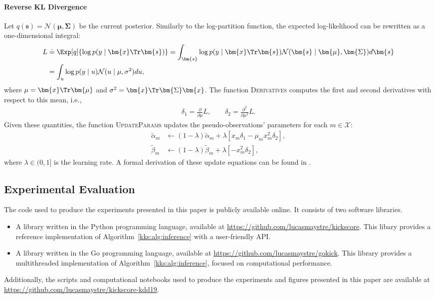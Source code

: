 \paragraph{Reverse KL Divergence}

Let $q(\bm{s}) = \mathcal{N}(\bm{\mu}, \bm{\Sigma})$ be the current posterior.
Similarly to the log-partition function, the expected log-likelihood can be rewritten as a one-dimensional integral:
\begin{align*}
	L
	 & \doteq \Exp[q]{ \log p(y \mid \bm{x}\Tr \bm{s}) }
	= \int_{\bm{s}} \log p(y \mid \bm{x}\Tr \bm{s}) \mathcal{N}(\bm{s} \mid \bm{\mu}, \bm{\Sigma}) d\bm{s} \\
	 & = \int_{u} \log p(y \mid u) \mathcal{N}(u \mid \mu, \sigma^2) du,
\end{align*}
where $\mu = \bm{x}\Tr \bm{\mu}$ and $\sigma^2 = \bm{x}\Tr \bm{\Sigma} \bm{x}$.
The function \textsc{Derivatives} computes the first and second derivatives with respect to this mean, i.e.,
\begin{align*}
	\delta_1 = \frac{\partial}{\partial \mu} L, \qquad
	\delta_2 = \frac{\partial^2}{\partial \mu^2} L.
\end{align*}
Given these quantities, the function \textsc{UpdateParams} updates the pseudo-observations' parameters for each $m \in \mathcal{X}$:
\begin{align*}
	\tilde{\alpha}_m & \gets (1 - \lambda) \tilde{\alpha}_m
	+ \lambda \left[ x_m \delta_1 - \mu_m x_m^2 \delta_2 \right], \\
	\tilde{\beta}_m  & \gets (1 - \lambda) \tilde{\beta}_m
	+ \lambda \left[ -x_m^2 \delta_2 \right],
\end{align*}
where $\lambda \in (0, 1]$ is the learning rate.
A formal derivation of these update equations can be found in \citet{khan2017conjugate}.

\subsection{Experimental Evaluation}
\label{kks:app:eval}

The code used to produce the experiments presented in this paper is publicly available online.
It consists of two software libraries.
\begin{itemize}
	\item A library written in the Python programming language, available at \url{https://github.com/lucasmaystre/kickscore}.
	      This libary provides a reference implementation of Algorithm~\ref{kks:alg:inference} with a user-friendly API.

	\item A library written in the Go programming language, available at \url{https://github.com/lucasmaystre/gokick}.
	      This library provides a multithreaded implementation of Algorithm~\ref{kks:alg:inference}, focused on computational performance.
\end{itemize}
Additionally, the scripts and computational notebooks used to produce the experiments and figures presented in this paper are available at \url{https://github.com/lucasmaystre/kickscore-kdd19}.

